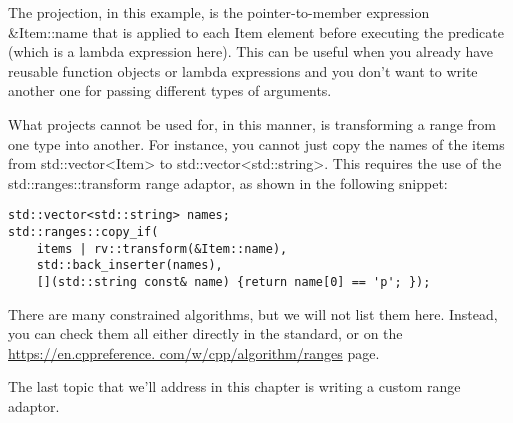 The projection, in this example, is the pointer-to-member expression \&Item::name that is applied to each Item element before executing the predicate (which is a lambda expression here). This can be useful when you already have reusable function objects or lambda expressions and you don’t want to write another one for passing different types of arguments.

What projects cannot be used for, in this manner, is transforming a range from one type into another. For instance, you cannot just copy the names of the items from std::vector<Item> to std::vector<std::string>. This requires the use of the std::ranges::transform range adaptor, as shown in the following snippet:

\begin{lstlisting}[style=styleCXX]
std::vector<std::string> names;
std::ranges::copy_if(
	items | rv::transform(&Item::name),
	std::back_inserter(names),
	[](std::string const& name) {return name[0] == 'p'; });
\end{lstlisting}

There are many constrained algorithms, but we will not list them here. Instead, you can check them all either directly in the standard, or on the \url{https://en.cppreference.
com/w/cpp/algorithm/ranges} page.

The last topic that we’ll address in this chapter is writing a custom range adaptor.




























